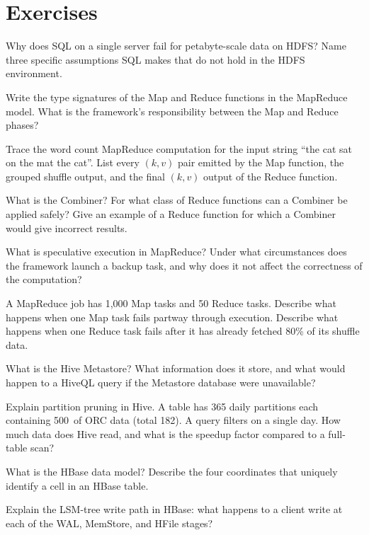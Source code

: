 \section*{Exercises}
\label{sec:ch4-exercises}


\sq Why does SQL on a single server fail for petabyte-scale data on HDFS?
Name three specific assumptions SQL makes that do not hold in the HDFS
environment.

\sq Write the type signatures of the Map and Reduce functions in the
MapReduce model. What is the framework's responsibility between the Map
and Reduce phases?

\sq Trace the word count MapReduce computation for the input string
``the cat sat on the mat the cat''. List every $(k, v)$ pair emitted
by the Map function, the grouped shuffle output, and the final
$(k, v)$ output of the Reduce function.

\sq What is the Combiner? For what class of Reduce functions can a
Combiner be applied safely? Give an example of a Reduce function for
which a Combiner would give incorrect results.

\sq What is speculative execution in MapReduce? Under what circumstances
does the framework launch a backup task, and why does it not affect
the correctness of the computation?

\sq A MapReduce job has 1,000 Map tasks and 50 Reduce tasks. Describe
what happens when one Map task fails partway through execution.
Describe what happens when one Reduce task fails after it has already
fetched 80\% of its shuffle data.

\sq What is the Hive Metastore? What information does it store, and what
would happen to a HiveQL query if the Metastore database were
unavailable?

\sq Explain partition pruning in Hive. A table has 365 daily partitions
each containing 500\GB\ of ORC data (total 182\TB). A query filters
on a single day. How much data does Hive read, and what is the speedup
factor compared to a full-table scan?

\sq What is the HBase data model? Describe the four coordinates that
uniquely identify a cell in an HBase table.

\sq Explain the LSM-tree write path in HBase: what happens to a client
write at each of the WAL, MemStore, and HFile stages?

